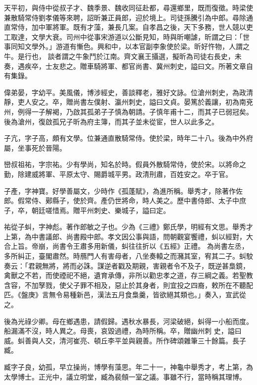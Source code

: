 \begin{pinyinscope}
 天平初，與侍中從叔子才、魏季景、魏收同征赴都，尋還鄉里，既而復徵。時梁使兼散騎常侍劉孝儀等來聘，詔昕兼正員郎，迎於境上。司徒孫騰引為中郎。尋除通直常侍，加中軍將軍。既有才藻，兼長几案。自孝昌之後，天下多務，世人競以吏工取達，文學大衰。司州中從事宋游道以公斷見知，時與昕嘲謔，昕謂之曰：「世事同知文學外。」游道有慚色。興和中，以本官副李象使於梁。昕好忤物，人謂之牛。是行也，
 談者謂之牛象鬥於江南。齊文襄王攝選，擬昕為司徒右長史，未奏，遇疾卒，士友悲之。贈車騎將軍、都官尚書、冀州刺史，謚曰文。所著文章自有集錄。



 偉弟晏，字幼平。美風儀，博涉經史，善談釋老，雅好文詠。位滄州刺史，為政清靜，吏人安之。卒，贈尚書左僕射、瀛州刺史，謚曰文貞。晏篤於義讓，初為南兗州，例得一子解褐，乃啟其孤弟子子慎為朝請。子慎年甫十二，而其子已弱冠矣。後為滄州，復啟孤兄子昕為府主簿，而其子並未從宦，世人以此多之。



 子亢，字子高，頗有文學。位兼通直散騎常侍。使於梁，時年二十八。後為中外府屬，坐事死於晉陽。



 巒叔祖祐，字宗祐。少有學尚，知名於時。假員外散騎常侍，使於宋。以將命之勤，除建威將軍、平原太守、賜爵城平男。政清刑肅，百姓安之。卒于官。



 子產，字神寶。好學善屬文，少時作《孤蓬賦》，為進所稱。舉秀才，除著作佐郎。假常侍、鄚縣子，使於齊。產仍世將命，時人美之。歷中書侍郎、太子中庶子，卒，朝廷嗟惜焉。贈平州刺史、樂城子，謚曰定。



 祐從子虯，字神彪。著作郎敏之子也。少為《三禮》鄭氏學，明經有文思。舉秀才上第，為中書議郎、尚書殿中郎。孝文因公事與語，問朝觀宴饗禮，虯以經對，大合上旨。帝崩，尚書令王肅多用新儀，虯往往折以《五經》正禮。
 為尚書左丞，多所糾正，臺閣肅然。時鴈門人有害母者，八坐奏轅之而瀦其室，宥其二子。虯駮奏云：「君親無將，將而必誅。謀逆者戳及期親，害親者令不及子，既逆甚梟鏡，禽獸之不若，而使禋祀不絕，遺育承傳，非所以勸忠孝之道，存三綱之義。若聖教含容，不加孥戮，使父子罪不相及，惡止於其身者，則宜投之四裔，敕所在不聽配匹。《盤庚》言無令易種新邑，漢法五月食梟羹，皆欲絕其類也。」奏入，宣武從之。



 後為光祿少卿。母在鄉遇患，請假歸。遇秋水暴長，河梁破絕，虯得一小船而度。船漏滿不沒，時人異之。母喪，哀毀過禮，為時所稱。卒，贈幽州刺
 史，謚曰威。虯善與人交，清河崔亮、頓丘李平並與親善。所作碑頌雜筆三十餘篇。長子臧。



 臧字子良，幼孤，早立操尚，博學有藻思。年二十一，神龜中舉秀才，考上第，為太學博士。正光中，議立明堂，臧為裴頠一室之議。事雖不行，當時稱其理博。




\end{pinyinscope}
